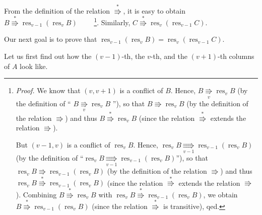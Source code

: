 \documentclass[numbers=enddot,12pt,final,onecolumn,notitlepage]{scrartcl}%
\theoremstyle{definition}
\begin{document}
From the definition of the relation $\overset{\ast}{\Rrightarrow}$, it is easy
to obtain $B\overset{\ast}{\Rrightarrow}\operatorname*{res}\nolimits_{v-1}%
\left(  \operatorname*{res}\nolimits_{v}B\right)  $%
\ \ \ \ \footnote{\textit{Proof.} We know that $\left(  v,v+1\right)  $ is a
conflict of $B$. Hence, $B\underset{v}{\Rrightarrow}\operatorname*{res}%
\nolimits_{v}B$ (by the definition of \textquotedblleft%
$B\underset{v}{\Rrightarrow}\operatorname*{res}\nolimits_{v}B$%
\textquotedblright), so that $B\Rrightarrow\operatorname*{res}\nolimits_{v}B$
(by the definition of the relation $\Rrightarrow$) and thus $B\overset{\ast
}{\Rrightarrow}\operatorname*{res}\nolimits_{v}B$ (since the relation
$\overset{\ast}{\Rrightarrow}$ extends the relation $\Rrightarrow$).
\par
But $\left(  v-1,v\right)  $ is a conflict of $\operatorname*{res}%
\nolimits_{v}B$. Hence, $\operatorname*{res}\nolimits_{v}%
B\underset{v-1}{\Rrightarrow}\operatorname*{res}\nolimits_{v-1}\left(
\operatorname*{res}\nolimits_{v}B\right)  $ (by the definition of
\textquotedblleft$\operatorname*{res}\nolimits_{v}B\underset{v-1}{\Rrightarrow
}\operatorname*{res}\nolimits_{v-1}\left(  \operatorname*{res}\nolimits_{v}%
B\right)  $\textquotedblright), so that $\operatorname*{res}\nolimits_{v}%
B\Rrightarrow\operatorname*{res}\nolimits_{v-1}\left(  \operatorname*{res}%
\nolimits_{v}B\right)  $ (by the definition of the relation $\Rrightarrow$)
and thus $\operatorname*{res}\nolimits_{v}B\overset{\ast}{\Rrightarrow
}\operatorname*{res}\nolimits_{v-1}\left(  \operatorname*{res}\nolimits_{v}%
B\right)  $ (since the relation $\overset{\ast}{\Rrightarrow}$ extends the
relation $\Rrightarrow$). Combining $B\overset{\ast}{\Rrightarrow
}\operatorname*{res}\nolimits_{v}B$ with $\operatorname*{res}\nolimits_{v}%
B\overset{\ast}{\Rrightarrow}\operatorname*{res}\nolimits_{v-1}\left(
\operatorname*{res}\nolimits_{v}B\right)  $, we obtain $B\overset{\ast
}{\Rrightarrow}\operatorname*{res}\nolimits_{v-1}\left(  \operatorname*{res}%
\nolimits_{v}B\right)  $ (since the relation $\overset{\ast}{\Rrightarrow}$ is
transitive), qed.}. Similarly, $C\overset{\ast}{\Rrightarrow}%
\operatorname*{res}\nolimits_{v}\left(  \operatorname*{res}\nolimits_{v-1}%
C\right)  $.

Our next goal is to prove that $\operatorname*{res}\nolimits_{v-1}\left(
\operatorname*{res}\nolimits_{v}B\right)  =\operatorname*{res}\nolimits_{v}%
\left(  \operatorname*{res}\nolimits_{v-1}C\right)  $.

Let us first find out how the $\left(  v-1\right)  $-th, the $v$-th, and the
$\left(  v+1\right)  $-th columns of $A$ look like.
\end{document}
